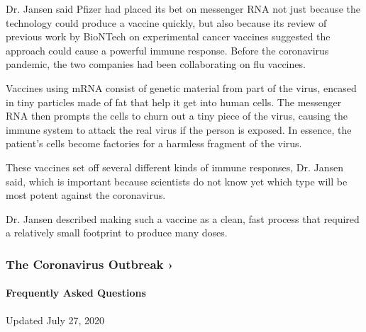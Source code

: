 Dr. Jansen said Pfizer had placed its bet on messenger RNA not just
because the technology could produce a vaccine quickly, but also because
its review of previous work by BioNTech on experimental cancer vaccines
suggested the approach could cause a powerful immune response. Before
the coronavirus pandemic, the two companies had been collaborating on
flu vaccines.

Vaccines using mRNA consist of genetic material from part of the virus,
encased in tiny particles made of fat that help it get into human cells.
The messenger RNA then prompts the cells to churn out a tiny piece of
the virus, causing the immune system to attack the real virus if the
person is exposed. In essence, the patient's cells become factories for
a harmless fragment of the virus.

These vaccines set off several different kinds of immune responses, Dr.
Jansen said, which is important because scientists do not know yet which
type will be most potent against the coronavirus.

Dr. Jansen described making such a vaccine as a clean, fast process that
required a relatively small footprint to produce many doses.

\href{https://www.nytimes.com/news-event/coronavirus?action=click\&pgtype=Article\&state=default\&region=MAIN_CONTENT_3\&context=storylines_faq}{}

\hypertarget{the-coronavirus-outbreak-}{%
\subsubsection{The Coronavirus Outbreak
›}\label{the-coronavirus-outbreak-}}

\hypertarget{frequently-asked-questions}{%
\paragraph{Frequently Asked
Questions}\label{frequently-asked-questions}}

Updated July 27, 2020

